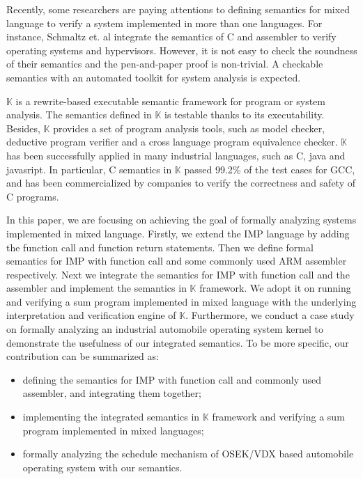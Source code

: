 \documentclass[conference]{IEEEtran}
\begin{document}
 Recently, some researchers are paying attentions to defining semantics for mixed language to verify a system implemented in more than one languages. For instance, Schmaltz et. al \cite{} integrate the semantics of C and assembler to verify operating systems and hypervisors. However, it is not easy to check the soundness of their semantics and the pen-and-paper proof is non-trivial. A checkable semantics with an automated toolkit for system analysis is expected. 
 
 $\mathbb{K}$ is a rewrite-based executable semantic framework for program or system analysis. The semantics defined in $\mathbb{K}$ is testable thanks to its executability. Besides, $\mathbb{K}$ provides a set of program analysis tools, such as model checker, deductive
 program verifier and a cross language program
 equivalence checker. $\mathbb{K}$ has been successfully applied in many industrial languages, such as C, java and javasript. In particular, C semantics in $\mathbb{K}$ passed 99.2\% of the test cases for GCC, and has been commercialized by companies to verify the correctness and safety of C programs.
 
 In this paper, we are focusing on achieving the goal of formally analyzing systems implemented in mixed language. Firstly, we extend the IMP language by adding the function call and function return statements. Then we define formal semantics for IMP with function call and some commonly used ARM assembler respectively. Next we integrate the semantics for IMP with function call and the assembler and implement the semantics in $\mathbb{K}$ framework. We adopt it on running and verifying a sum program implemented in mixed language with the underlying interpretation and verification engine of $\mathbb{K}$. Furthermore, we conduct a case study on formally analyzing an industrial automobile operating system kernel to demonstrate the usefulness of our integrated semantics. To be more specific, our contribution can be summarized as:
\begin{itemize}
	\item defining the semantics for IMP with function call and commonly used assembler, and integrating them together;
	\item implementing the integrated semantics in $\mathbb{K}$ framework and verifying a sum program implemented in mixed languages;
	\item formally analyzing the schedule mechanism of OSEK/VDX based automobile operating system with our semantics. 
\end{itemize}
 
\end{document}
